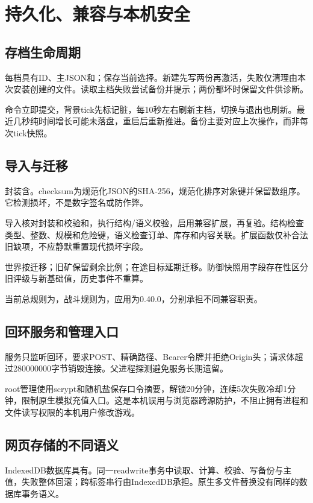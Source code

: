 \chapter{持久化、兼容与本机安全}
\section{存档生命周期}
每档具有ID、主JSON和；保存当前选择。新建先写两份再激活，失败仅清理由本次安装创建的文件。读取主档失败尝试备份并提示；两份都坏时保留文件供诊断。

命令立即提交，背景tick先标记脏，每10秒左右刷新主档，切换与退出也刷新。最近几秒纯时间增长可能未落盘，重启后重新推进。备份主要对应上次操作，而非每次tick快照。

\section{导入与迁移}
封装含。checksum为规范化JSON的SHA-256，规范化排序对象键并保留数组序。它检测损坏，不是数字签名或防作弊。

导入核对封装和校验和，执行结构/语义校验，启用兼容扩展，再复验。结构检查类型、整数、规模和危险键，语义检查订单、库存和内容关联。扩展函数仅补合法旧缺项，不应静默重置现代损坏字段。

世界按迁移；旧矿保留剩余比例；在途目标延期迁移。防御快照用字段存在性区分旧评级与新基础值，历史事件不重算。

当前总规则为，战斗规则为，应用为0.40.0，分别承担不同兼容职责。

\section{回环服务和管理入口}
服务只监听回环，要求POST、精确路径、Bearer令牌并拒绝Origin头；请求体超过280000000字节销毁连接。父进程探测避免服务长期遗留。

root管理使用scrypt和随机盐保存口令摘要，解锁20分钟，连续5次失败冷却1分钟，限制原生模拟充值入口。这是本机误用与浏览器跨源防护，不阻止拥有进程和文件读写权限的本机用户修改游戏。

\section{网页存储的不同语义}
IndexedDB数据库具有。同一readwrite事务中读取、计算、校验、写备份与主值，失败整体回滚；跨标签串行由IndexedDB承担。原生多文件替换没有同样的数据库事务语义。
